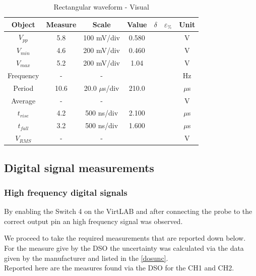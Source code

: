 \documentclass[../main.tex]{subfiles}
\begin{document}
\begin{table}[h!]
\centering	

\begin{tabular}{ccccccc}
\textbf{Object} & \textbf{Measure} & \textbf{Scale}  & \textbf{Value}  & \textbf{$\delta$} & \textbf{$\varepsilon_{\%}$} & \textbf{Unit} \\
\hline
 $V_{pp}$ & 5.8 &  100 mV/div & 0.580 & &  & V \\
 \hline
 $V_{min}$ & 4.6  &  200 mV/div  & 0.460  &  & &  V \\
 \hline
 $V_{max}$ & 5.2 &  200 mV/div &  1.04 & &  & V  \\
 \hline
 Frequency & -  & -  &  &  &  & Hz \\
 \hline
 Period &  10.6 &  20.0 $\mu$s/div &  210.0 &  &   & $\mu$s \\
 \hline
 Average & - & - &   &   & &  V \\ 
 \hline
 $t_{rise}$ & 4.2 &  500 ns/div & 2.100  &  &  & $\mu$s \\
 \hline
 $t_{fall}$ & 3.2  & 500 ns/div & 1.600  &  &  & $\mu$s \\
 \hline
 $V_{RMS}$ & - & - &   &  &  & V \\
 

\end{tabular}
\caption*{Rectangular waveform - Visual}
\end{table}




\subsection{Digital signal measurements}



\subsubsection*{High frequency digital signals}


By enabling the Switch 4 on the VirtLAB and after connecting the probe to the correct output pin an high frequency signal was observed.


We proceed to take the required measurements that are reported down below.
For the measure give by the DSO the uncertainty was calculated via the data given by the manufacturer and listed in the \autoref{dosunc}.\\

Reported here are the measures found via the DSO for the CH1 and CH2.
\end{document}

